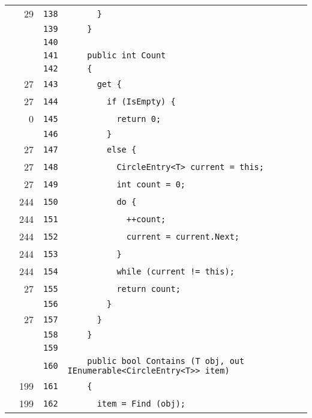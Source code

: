 \documentclass[a4paper,10pt]{article}
\begin{document}
\begin{longtable}[l]{lrrl}
\cellcolor{green} & 29 & \verb~138~ & \verb~      }~\\
\cellcolor{gray} &  & \verb~139~ & \verb~    }~\\
\cellcolor{gray} &  & \verb~140~ & \verb~~\\
\cellcolor{gray} &  & \verb~141~ & \verb~    public int Count~\\
\cellcolor{gray} &  & \verb~142~ & \verb~    {~\\
\cellcolor{green} & 27 & \verb~143~ & \verb~      get {~\\
\cellcolor{green} & 27 & \verb~144~ & \verb~        if (IsEmpty) {~\\
\cellcolor{red} & 0 & \verb~145~ & \verb~          return 0;~\\
\cellcolor{gray} &  & \verb~146~ & \verb~        }~\\
\cellcolor{green} & 27 & \verb~147~ & \verb~        else {~\\
\cellcolor{green} & 27 & \verb~148~ & \verb~          CircleEntry<T> current = this;~\\
\cellcolor{green} & 27 & \verb~149~ & \verb~          int count = 0;~\\
\cellcolor{green} & 244 & \verb~150~ & \verb~          do {~\\
\cellcolor{green} & 244 & \verb~151~ & \verb~            ++count;~\\
\cellcolor{green} & 244 & \verb~152~ & \verb~            current = current.Next;~\\
\cellcolor{green} & 244 & \verb~153~ & \verb~          }~\\
\cellcolor{green} & 244 & \verb~154~ & \verb~          while (current != this);~\\
\cellcolor{green} & 27 & \verb~155~ & \verb~          return count;~\\
\cellcolor{gray} &  & \verb~156~ & \verb~        }~\\
\cellcolor{green} & 27 & \verb~157~ & \verb~      }~\\
\cellcolor{gray} &  & \verb~158~ & \verb~    }~\\
\cellcolor{gray} &  & \verb~159~ & \verb~~\\
\cellcolor{gray} &  & \verb~160~ & \verb~    public bool Contains (T obj, out IEnumerable<CircleEntry<T>> item)~\\
\cellcolor{green} & 199 & \verb~161~ & \verb~    {~\\
\cellcolor{green} & 199 & \verb~162~ & \verb~      item = Find (obj);~\\

\end{longtable}
\end{document}
